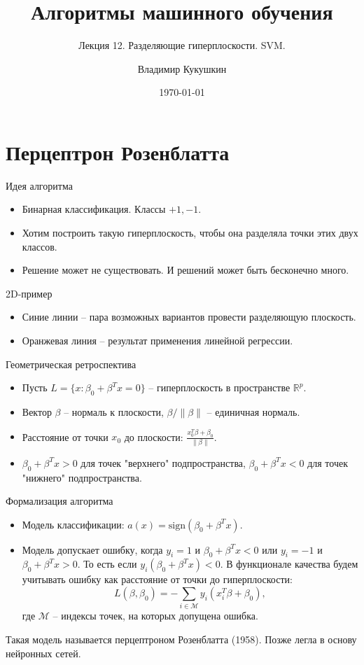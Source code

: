 \documentclass[9pt]{beamer}
\title{Алгоритмы машинного обучения}
\subtitle{Лекция 12. Разделяющие гиперплоскости. SVM.}
\author{Владимир Кукушкин}
\institute{СПбГЭУ - 17.03.2021}
\date{\today}
\begin{document}
\titlepage

\section{Перцептрон Розенблатта}

\begin{frame}{Идея алгоритма}
    \begin{itemize}
        \item Бинарная классификация. Классы $+1, -1$.
        \item Хотим построить такую гиперплоскость, чтобы она разделяла точки этих двух классов.
        \item Решение может не существовать. И решений может быть бесконечно много.
    \end{itemize}
\end{frame}

\begin{frame}{2D-пример}
    \begin{itemize}
        \item Синие линии -- пара возможных вариантов провести разделяющую плоскость.
        \item Оранжевая линия -- результат применения линейной регрессии.
    \end{itemize}
\end{frame}

\begin{frame}{Геометрическая ретроспектива}
\begin{itemize}
    \item Пусть $L = \{x: \beta_0 + \beta^T x = 0\}$ -- гиперплоскость в пространстве $\mathbb{R}^p$.
    \item Вектор $\beta$ -- нормаль к плоскости, $\beta/\|\beta\|$ -- единичная нормаль.
    \item Расстояние от точки $x_0$ до плоскости: $\frac{x_0^T\beta + \beta_0}{\|\beta\|}$.
    \item $\beta_0 + \beta^T x > 0$ для точек "верхнего" подпространства,\newline
    $\beta_0 + \beta^T x < 0$ для точек "нижнего" подпространства.
\end{itemize}
    
\end{frame}
\begin{frame}{Формализация алгоритма}
    \begin{itemize}
        \item Модель классификации: $a(x) = \text{sign} (\beta_0 + \beta^T x)$.
        \item Модель допускает ошибку, когда $y_i = 1$ и $\beta_0 + \beta^T x < 0$ или $y_i = -1$ и $\beta_0 + \beta^T x > 0$. То есть если $y_i(\beta_0 + \beta^T x) < 0$. В функционале качества будем учитывать ошибку как расстояние от точки до гиперплоскости:
        $$L(\beta, \beta_0) = -\sum_{i\in \mathcal{M}} y_i(x_i^T\beta + \beta_0),$$
        где $\mathcal{M}$ -- индексы точек, на которых допущена ошибка.
    \end{itemize}
    Такая модель называется перцептроном Розенблатта (1958). Позже легла в основу нейронных сетей.
\end{frame}
\end{document}

